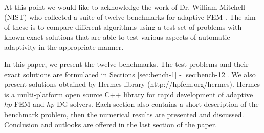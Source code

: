 At this point we would like to acknowledge the work of
Dr. William Mitchell (NIST) who collected a suite of
twelve benchmarks for adaptive FEM \cite{mitchell-1}. The aim of these is to compare different algorithms using a test set of problems
with known exact solutions that are able to test various aspects of
automatic adaptivity in the appropriate manner.

In this paper, we present the twelve benchmarks. The test problems and their exact solutions are formulated in Sections
\ref{sec:bench-1} - \ref{sec:bench-12}. We also present solutions obtained by {\sc Hermes} library (http://hpfem.org/hermes). {\sc Hermes} is a multi-platform 
open source C++ library for rapid development of adaptive $hp$-FEM 
and $hp$-DG solvers. Each section also contains a short description
of the benchmark problem, then the numerical results are
presented and discussed. Conclusion and outlooks are offered
in the last section of the paper.


